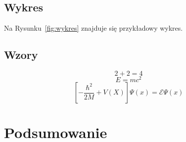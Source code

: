 \documentclass{article}
\begin{document}
\subsection{Wykres}
Na Rysunku~\ref{fig:wykres} znajduje się przykładowy wykres.
\subsection{Wzory}
\begin{equation}
2 + 2 = 4
\end{equation}
\begin{equation}
E = mc^2
\end{equation}
\begin{equation}
\left[- \frac{\hbar^2}{2M} + V(X) \right] \Psi(x)=  \mathcal{E} \Psi(x)
\end{equation}

\section{Podsumowanie}
\end{document}
